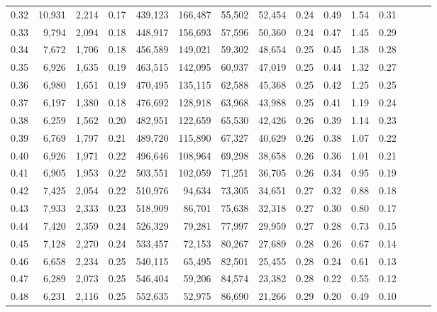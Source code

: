 \begin{tabular}{rrrrrrrrrrrrrrr}
0.32 &  10,931 &  2,214 &  0.17 &  439,123 &  166,487 &   55,502 &   52,454 &  0.24 &  0.49 &  1.54 &      0.31 \\
0.33 &   9,794 &  2,094 &  0.18 &  448,917 &  156,693 &   57,596 &   50,360 &  0.24 &  0.47 &  1.45 &      0.29 \\
0.34 &   7,672 &  1,706 &  0.18 &  456,589 &  149,021 &   59,302 &   48,654 &  0.25 &  0.45 &  1.38 &      0.28 \\
0.35 &   6,926 &  1,635 &  0.19 &  463,515 &  142,095 &   60,937 &   47,019 &  0.25 &  0.44 &  1.32 &      0.27 \\
0.36 &   6,980 &  1,651 &  0.19 &  470,495 &  135,115 &   62,588 &   45,368 &  0.25 &  0.42 &  1.25 &      0.25 \\
0.37 &   6,197 &  1,380 &  0.18 &  476,692 &  128,918 &   63,968 &   43,988 &  0.25 &  0.41 &  1.19 &      0.24 \\
0.38 &   6,259 &  1,562 &  0.20 &  482,951 &  122,659 &   65,530 &   42,426 &  0.26 &  0.39 &  1.14 &      0.23 \\
0.39 &   6,769 &  1,797 &  0.21 &  489,720 &  115,890 &   67,327 &   40,629 &  0.26 &  0.38 &  1.07 &      0.22 \\
0.40 &   6,926 &  1,971 &  0.22 &  496,646 &  108,964 &   69,298 &   38,658 &  0.26 &  0.36 &  1.01 &      0.21 \\
0.41 &   6,905 &  1,953 &  0.22 &  503,551 &  102,059 &   71,251 &   36,705 &  0.26 &  0.34 &  0.95 &      0.19 \\
0.42 &   7,425 &  2,054 &  0.22 &  510,976 &   94,634 &   73,305 &   34,651 &  0.27 &  0.32 &  0.88 &      0.18 \\
0.43 &   7,933 &  2,333 &  0.23 &  518,909 &   86,701 &   75,638 &   32,318 &  0.27 &  0.30 &  0.80 &      0.17 \\
0.44 &   7,420 &  2,359 &  0.24 &  526,329 &   79,281 &   77,997 &   29,959 &  0.27 &  0.28 &  0.73 &      0.15 \\
0.45 &   7,128 &  2,270 &  0.24 &  533,457 &   72,153 &   80,267 &   27,689 &  0.28 &  0.26 &  0.67 &      0.14 \\
0.46 &   6,658 &  2,234 &  0.25 &  540,115 &   65,495 &   82,501 &   25,455 &  0.28 &  0.24 &  0.61 &      0.13 \\
0.47 &   6,289 &  2,073 &  0.25 &  546,404 &   59,206 &   84,574 &   23,382 &  0.28 &  0.22 &  0.55 &      0.12 \\
0.48 &   6,231 &  2,116 &  0.25 &  552,635 &   52,975 &   86,690 &   21,266 &  0.29 &  0.20 &  0.49 &      0.10 \\

\end{tabular}
